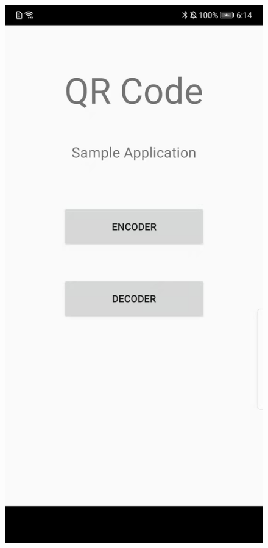 \documentclass[12pt, a4paper]{article}
\theoremstyle{definition}
\begin{document}
\begin{figure}[htbp]
	\centering
		\begin{minipage}[t]{0.25\linewidth}
		\centering
		\includegraphics[width=\linewidth]{5-1.jpeg}

\end{minipage}
\end{figure}
\end{document}
